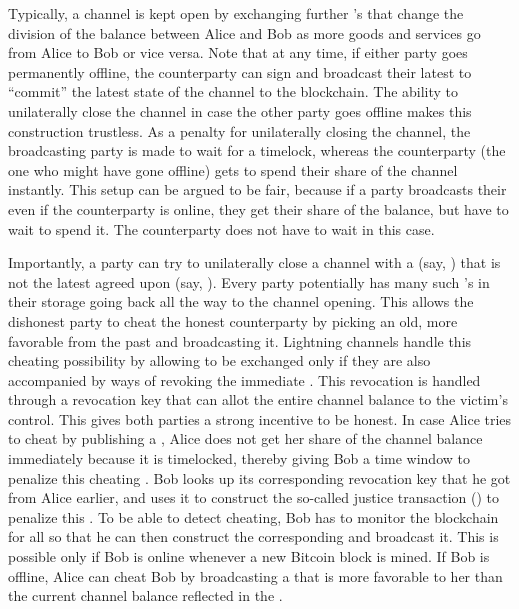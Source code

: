 Typically, a channel is kept open by exchanging further \ctx{}'s that change the division of the balance between Alice and Bob as more goods and services go from Alice to Bob or vice versa. Note that at any time, if either party goes permanently offline, the counterparty can sign and broadcast their latest \ctx{} to ``commit'' the latest state of the channel to the blockchain. The ability to unilaterally close the channel in case the other party goes offline makes this construction trustless. As a penalty for unilaterally closing the channel, the broadcasting party is made to wait for a timelock, whereas the counterparty (the one who might have gone offline) gets to spend their share of the channel instantly. This setup can be argued to be fair, because if a party broadcasts their \ctx{} even if the counterparty is online, they get their share of the balance, but have to wait to spend it. The counterparty does not have to wait in this case.

Importantly, a party can try to unilaterally close a channel with a \ctx{} (say, \previousctx{}) that is not the latest agreed upon \ctx{} (say, \latestctx{}). Every party potentially has many such \previousctx{}'s in their storage going back all the way to the channel opening. This allows the dishonest party to cheat the honest counterparty by picking an old, more favorable \previousctx{} from the past and broadcasting it. Lightning channels handle this cheating possibility by allowing \latestctx{} to be exchanged only if they are also accompanied by ways of revoking the immediate \previousctx{}. This revocation is handled through a revocation key that can allot the entire channel balance to the victim's control. This gives both parties a strong incentive to be honest. In case Alice tries to cheat by publishing a \previousctx{}, Alice does not get her share of the channel balance immediately because it is timelocked, thereby giving Bob a time window to penalize this cheating \previousctx{}. Bob looks up its corresponding revocation key that he got from Alice earlier, and uses it to construct the so-called justice transaction (\jtx{}) to penalize this \previousctx{}. To be able to detect cheating, Bob has to monitor the blockchain for all \previousctx{} so that he can then construct the corresponding \jtx{} and broadcast it. This is possible only if Bob is online whenever a new Bitcoin block is mined. If Bob is offline, Alice can cheat Bob by broadcasting a \previousctx{} that is more favorable to her than the current channel balance reflected in the \latestctx{}. 

